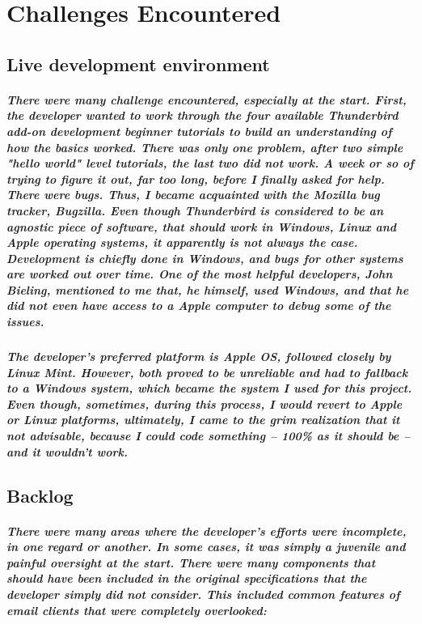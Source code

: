\chapter{Challenges Encountered}

\section{Live development environment}
\paragraph{There were many challenge encountered, especially at the start. First, the developer wanted to work through the four available Thunderbird add-on development beginner tutorials to build an understanding of how the basics worked. There was only one problem, after two simple "hello world" level tutorials, the last two did not work. A week or so of trying to figure it out, far too long, before I finally asked for help. There were bugs. Thus, I became acquainted with the Mozilla bug tracker, \emph{Bugzilla}. Even though Thunderbird is considered to be an agnostic piece of software, that should work in Windows, Linux and Apple operating systems, it apparently is not always the case. Development is chiefly done in Windows, and bugs for other systems are worked out over time. One of the most helpful developers, John Bieling, mentioned to me that, he himself, used Windows, and that he did not even have access to a Apple computer to debug some of the issues.}

\paragraph{The developer's preferred platform is Apple OS, followed closely by Linux Mint. However, both proved to be unreliable  and had to fallback to a Windows system, which became the system I used for this project. Even though, sometimes, during this process, I would revert to Apple or Linux platforms, ultimately, I came to the grim realization that it not advisable, because I could code something -- 100\% as it should be -- and it wouldn't work.}

\section{Backlog}

\paragraph{There were many areas where the developer's efforts were incomplete, in one regard or another. In some cases, it was simply a juvenile and painful oversight at the start. There were many components that should have been included in the original specifications that the developer simply did not consider. This included common features of email clients that were completely overlooked:} 

